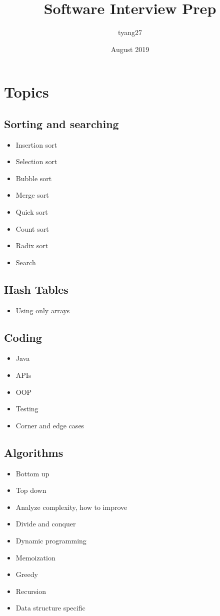 \documentclass{article}
\title{Software Interview Prep}
\author{tyang27}
\date{August 2019}
\begin{document}
\maketitle

\section{Topics}
\subsection{Sorting and searching}
\begin{itemize}
    \item Insertion sort
    \item Selection sort
    \item Bubble sort
    \item Merge sort
    \item Quick sort
    \item Count sort
    \item Radix sort
    \item Search
\end{itemize}

\subsection{Hash Tables}
\begin{itemize}
    \item Using only arrays
\end{itemize}

\subsection{Coding}
\begin{itemize}
    \item Java
    \item APIs
    \item OOP
    \item Testing
    \item Corner and edge cases
\end{itemize}

\subsection{Algorithms}
\begin{itemize}
    \item Bottom up
    \item Top down
    \item Analyze complexity, how to improve
    \item Divide and conquer
    \item Dynamic programming
    \item Memoization
    \item Greedy
    \item Recursion
    \item Data structure specific
\end{itemize}
\end{document}
